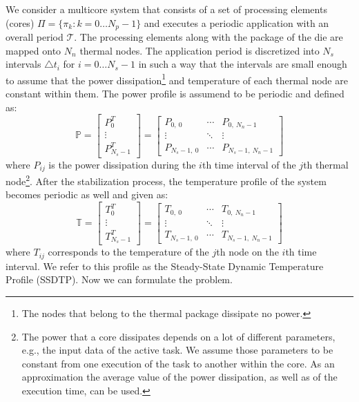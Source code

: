 We consider a multicore system that consists of a set of processing elements (cores) $\Pi = \{ \pi_k: k = 0 \dots N_p - 1 \}$ and executes a periodic application with an overall period $\mathcal{T}$. The processing elements along with the package of the die are mapped onto $N_n$ thermal nodes. The application period is discretized into $N_s$ intervals $\triangle t_i$ for $i = 0 \dots N_s - 1$ in such a way that the intervals are small enough to assume that the power dissipation\footnote{The nodes that belong to the thermal package dissipate no power.} and temperature of each thermal node are constant within them. The power profile is assumend to be periodic and defined as:
\begin{equation*}
  \mathbb{P} = \left[
    \begin{array}{c}
      P_0^T \\
      \vdots \\
      P_{N_s - 1}^T
    \end{array}
  \right] = \left[
    \begin{array}{ccc}
      P_{0, \: 0} & \cdots & P_{0, \: N_n - 1} \\
      \vdots & \ddots & \vdots \\
      P_{N_s - 1, \: 0} & \cdots & P_{N_s - 1, \: N_n - 1}
    \end{array}
  \right]
\end{equation*}
where $P_{ij}$ is the power dissipation during the $i$th time interval of the $j$th thermal node\footnote{The power that a core dissipates depends on a lot of different parameters, e.g., the input data of the active task. We assume those parameters to be constant from one execution of the task to another within the core. As an approximation the average value of the power dissipation, as well as of the execution time, can be used.}. After the stabilization process, the temperature profile of the system becomes periodic as well and given as:
\begin{equation*}
  \mathbb{T} = \left[
    \begin{array}{c}
      T_0^T \\
      \vdots \\
      T_{N_s - 1}^T
    \end{array}
  \right] = \left[
    \begin{array}{ccc}
      T_{0, \: 0} & \cdots & T_{0, \: N_n - 1} \\
      \vdots & \ddots & \vdots \\
      T_{N_s - 1, \: 0} & \cdots & T_{N_s - 1, \: N_n - 1}
    \end{array}
  \right]
\end{equation*}
where $T_{ij}$ corresponds to the temperature of the $j$th node on the $i$th time interval. We refer to this profile as the Steady-State Dynamic Temperature Profile (SSDTP). Now we can formulate the problem.

